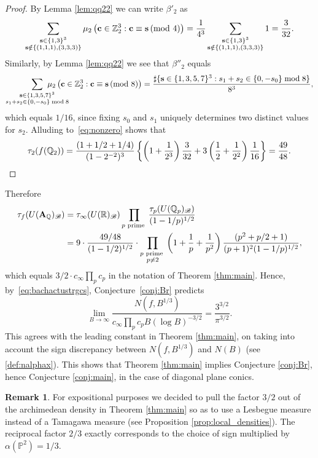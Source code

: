 \documentclass[a4paper,12pt,reqno]{amsart}
\numberwithin{equation}{section} \numberwithin{figure}{section}
\renewcommand\P{\mathbb{P}}
\newcommand\Z{\mathbb{Z}}
\newcommand\Q{\mathbb{Q}}
\newcommand\R{\mathbb{R}}
\newcommand{\Adele}{\mathbf{A}}
\newcommand{\br}{\mathscr{B}}
\newcommand{\md}[1]{  \left(\textnormal{mod}\ #1\right)}
\renewcommand{\l}{\left}
\renewcommand{\r}{\right}
\renewcommand{\b}{\mathbf}
\renewcommand{\#}{\sharp}
\theoremstyle{definition}
\newtheorem{remark}[lemma]{Remark}
\numberwithin{lemma}{section}
\begin{document}
\begin{proof}
By
Lemma \ref{lem:qq22} we can  write 
$\beta'_2$ as 
\[ \sum_{\substack{\b s \in \{1,3\}^3 \\ \b s \notin \{ (1,1,1), (3,3,3)\}}}
  \mu_2\l( \b c \in \Z_2^3:  \b c \equiv \b s  \md 4   \r) =
\frac{1}{4^3} \sum_{\substack{\b s \in \{1,3\}^3 \\ \b s \notin \{ (1,1,1), (3,3,3)\}}}1=\frac{3}{32} .\] 
Similarly, by Lemma \ref{lem:qq22} we see that $\beta''_2$ equals  
\[
 \sum_{\substack{\b s \in \{1,3, 5, 7\}^3 \\ s_1+s_2 \in \{ 0,-s_0  \}\bmod 8}} 
 \hspace{-1cm}
 \mu_2\l( \b c \in \Z_2^3:  \b c \equiv \b s  \md 8   \r) =
\frac{\#\{\b s \in \{1,3, 5, 7\}^3 : s_1+s_2 \in \{ 0,-s_0  \}\bmod 8\}}{8^3},\]
which equals $1/16$,
since   fixing $s_0$ and $s_1$ uniquely 
 determines two distinct values for $ s_2$.
 Alluding to~\eqref{eq:nonzero} shows that 
\[
\tau_2(f(\Q_2)) = 
\frac{(1 + 1/2 + 1/4)}{(1-2^{-2})^{3}}
\l\{
  \l(1+\frac{1}{2^3}  \r) 
\frac{3}{32}
 +3
\l(\frac{1}{2} +\frac{1}{2^2} \r )
\frac{1}{16} \r\}
=\frac{49}{48}  . \qedhere
\]
 \end{proof}
Therefore
\begin{align*}
\tau_f(U(\Adele_\Q)_{\br})
&=
  \tau_\infty (U(\R)_\br)
  \prod_{\substack{ p \text{ \rm prime }  } }
  \frac{   \tau_p(U(\Q_p)_\br)}{     (1-1/p )^{1/2} }
\\&
=
9\cdot 
  \frac{  	49/48 }{     (1-1/2 )^{1/2} }
\cdot   \prod_{\substack{ p \text{ \rm prime } \\ p\neq 2  } }
\l(1+\frac{1}{p}+ \frac{1}{p^2} \r)
  \frac{  	 (p^2+p/2+1)  }{  (p+1)^2   (1-1/p )^{1/2} }
,
\end{align*}
which equals $3/2 \cdot c_\infty \prod_p c_p$ in the notation of  Theorem \ref{thm:main}.
Hence, by~\eqref{eq:bachactustrgcs}, 
 	Conjecture~\ref{conj:Br} predicts
$$
\lim_{B\to \infty } \frac{N(f,B^{1/3} )}{c_\infty \prod_p c_p B (\log B)^{-3/2}}
=
  \frac{3^{3/2} }{\pi^{3/2} }  
.$$ 
This agrees with the leading constant in 
Theorem \ref{thm:main}, on taking into account the sign discrepancy between $N(f,B^{1/3})$
and $N(B)$ (see \eqref{def:nalphax}). This shows that Theorem \ref{thm:main} implies
 Conjecture \ref{conj:Br}, hence Conjecture \ref{conj:main}, 
in the case of  diagonal plane  conics.

\begin{remark}
For expositional purposes we decided to pull the factor $3/2$ out of the archimedean density in Theorem \ref{thm:main} so as to use a Lesbegue measure instead of a Tamagawa measure (see Proposition \ref{prop:local_densities}). The reciprocal factor $2/3$ exactly corresponds to the choice of sign multiplied by $\alpha(\P^2) = 1/3$.
\end{remark}
\end{document}
